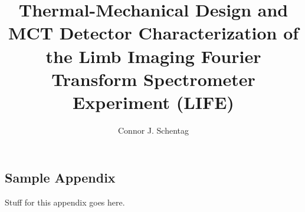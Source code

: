 \documentclass[12pt, proposal]{uofsthesis-cs}
\title{Thermal-Mechanical Design and MCT Detector Characterization of the Limb Imaging Fourier Transform Spectrometer Experiment (LIFE)}
\author{Connor J. Schentag}
\begin{document}
\maketitle

\frontmatter








%

\uofsappendix

\begin{appendices}

\chapter{Sample Appendix}

Stuff for this appendix goes here.

\end{appendices}
\end{document}
